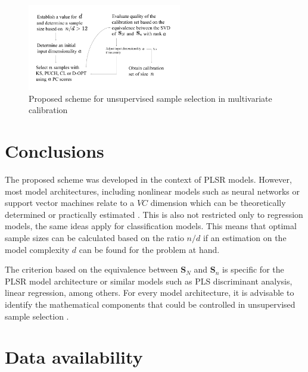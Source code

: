 \documentclass[journal=ancham,manuscript=article]{achemso}
\begin{document}
\begin{figure}[b]
\includegraphics[width=0.6\textwidth]{manuscript/figures/scheme.png}
\centering
\caption{Proposed scheme for unsupervised sample selection in multivariate calibration}
\label{fig_scheme}
\end{figure}


\section*{Conclusions}\label{conclusions}

The proposed scheme was developed in the context of PLSR models. However, most model architectures, including nonlinear models such as neural networks or support vector machines relate to a $VC$ dimension which can be theoretically determined or practically estimated \cite{Vapnik2019, Vapnik1994}. This is also not restricted only to regression models, the same ideas apply for classification models. This means that optimal sample sizes can be calculated based on the ratio $n/d$ if an estimation on the model complexity $d$ can be found for the problem at hand. 

The criterion based on the equivalence between $\mathbf{S}_N$ and $\mathbf{S}_n$ is specific for the PLSR model architecture or similar models such as PLS discriminant analysis, linear regression, among others. For every model architecture, it is advisable to identify the mathematical components that could be controlled in unsupervised sample selection \cite{Li2020}.  





\section{Data availability}
\end{document}
